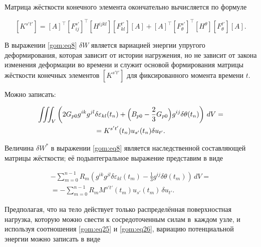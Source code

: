 Матрица жёсткости конечного элемента окончательно вычисляется по формуле

\begin{equation}

\label{gom:eq24}

[K^{s't'}]=[A]^\top[F_{ij}^{s'}]^\top[H^{ijkl}][F_{kl}^{t'}][A]+[A]^\top[F_{\theta}^{s'}]^\top[H^{\theta}][F_{\theta}^{t'}][A]. \end{equation}



В выражении \eqref{gom:eq8} $\delta W$ является вариацией энергии упругого деформирования, которая зависит от истории нагружения, но не зависит от закона изменения деформации во времени и служит основой формирования матрицы жёсткости конечных элементов $[K^{s't'}]$ для фиксированного момента времени $t$. 

Можно записать:

\begin{multline}

\label{gom:eq25}

\iiint_{V}\left(2G_{p0}g^{ik}g^{jl}\delta\varepsilon_{kl}(t_{n})+\Bigl(B_{p0}-\frac{2}{3}G_{p0}\Bigr) g^{ij}\delta\theta(t_{n})\right)\, dV= \\ =

K^{s't'}(t_{n})u_{s'}(t_{n})\delta u_{t'}.

\end{multline}



Величина $\delta W^{*}$ в выражении \eqref{gom:eq8} является наследственной составляющей матрицы жёсткости; её подынтегральное выражение  представим в виде 

\begin{multline}

\label{gom:eq26}

-\sum_{m=0}^{n-1}R_{m}\left(g^{ik}g^{jl}\delta\varepsilon_{kl}(t_{m})-\frac{1}{3}g^{ij}\delta\theta(t_{m})\right)\,dV= \\ =

-\sum_{m=0}^{n-1}R_{m}M^{s't'}(t_{m})u_{s'}(t_{m})\,\delta u_{t'}. 

\end{multline}



Предполагая, что на тело действует только распределённая поверхностная нагрузка, которую можно свести к сосредоточенным силам в~каждом узле, и используя соотношения \eqref{gom:eq25} и \eqref{gom:eq26}, вариацию потенциальной энергии можно записать в виде

